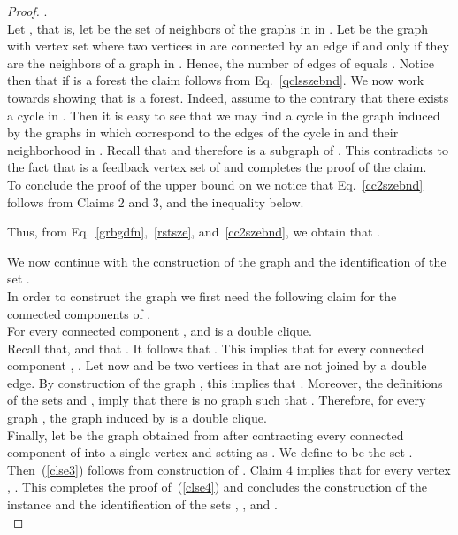 \documentclass[a4paper,11pt]{article}
\begin{document}
\begin{proof}
 .\\


 Let , 
that is, let  be the set of neighbors of the graphs in  in .
Let  be the graph with vertex set  where two vertices in  are connected by an edge if and only if they are the neighbors of
a graph  in . Hence, the number of edges of  equals .
Notice then that if  is a forest the claim follows from Eq.~\eqref{qclsszebnd}.
We now work towards showing that  is a forest. Indeed, assume to the contrary that there exists a cycle in . 
Then it is easy to see that we may find a cycle
in the graph  induced by the graphs in  which correspond to the edges of the cycle in 
and their neighborhood in .
Recall that  and therefore  is a subgraph of .
This contradicts to the fact that  is a feedback vertex set of  and completes the proof of the claim.
\hfill \\


\noindent To conclude the proof of the upper bound on  we notice that Eq.~\eqref{cc2szebnd} follows from Claims 2 and 3, and the inequality below.

Thus, from Eq.~\eqref{grbgdfn},~\eqref{rstsze}, and~\eqref{cc2szebnd}, we obtain that .


\medskip

We now continue with the construction of the graph  and the identification of the set .\\

\noindent In order to construct the graph  we first need the following claim for the connected components of .\\

 For every connected component ,  and
 is a double clique.\\

 Recall that,  and that . It follows that
. 
This implies that for every connected component , .
Let now  and  be two vertices in  that are not joined by a double edge. 
By construction of the graph , this implies that .
Moreover, the definitions of the sets  and , imply that there is no graph  such that 
. Therefore, for every graph , 
the graph induced by  is a double clique.
 \hfill \\

\noindent Finally, let  be the graph obtained from  after contracting every connected component  of  
into a single vertex  and setting as . We define  to be the set . 
Then~(\ref{clse3}) follows from construction of . Claim 4 implies that for every vertex , . 
This completes the proof of~(\ref{clse4}) and concludes the construction of the instance 
 and the identification of the sets , , and .\\


\end{proof}
\end{document}
